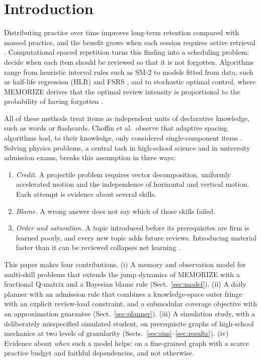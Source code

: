 \documentclass[runningheads]{llncs}
\begin{document}
\section{Introduction}

Distributing practice over time improves long-term retention compared with massed practice, and the benefit grows when each session requires active retrieval \cite{cepeda2006,kang2016}. Computational spaced repetition turns this finding into a scheduling problem: decide when each item should be reviewed so that it is not forgotten. Algorithms range from heuristic interval rules such as SM-2 \cite{wozniak1990} to models fitted from data, such as half-life regression (HLR) \cite{settles2016} and FSRS \cite{ye2022,su2023}, and to stochastic optimal control, where MEMORIZE derives that the optimal review intensity is proportional to the probability of having forgotten \cite{tabibian2019}.

All of these methods treat items as independent units of declarative knowledge, such as words or flashcards. Choffin et al.\ observe that adaptive spacing algorithms had, to their knowledge, only considered single-component items \cite{choffin2021}. Solving physics problems, a central task in high-school science and in university admission exams, breaks this assumption in three ways:

\begin{enumerate}
\item \emph{Credit.} A projectile problem requires vector decomposition, uniformly accelerated motion and the independence of horizontal and vertical motion. Each attempt is evidence about several skills.
\item \emph{Blame.} A wrong answer does not say which of those skills failed.
\item \emph{Order and saturation.} A topic introduced before its prerequisites are firm is learned poorly, and every new topic adds future reviews. Introducing material faster than it can be reviewed collapses net learning \cite{reddy2016}.
\end{enumerate}

This paper makes four contributions. (i) A memory and observation model for multi-skill problems that extends the jump dynamics of MEMORIZE with a fractional Q-matrix and a Bayesian blame rule (Sect.~\ref{sec:model}). (ii) A daily planner with an admission rule that combines a knowledge-space outer fringe with an explicit review-load constraint, and a submodular coverage objective with an approximation guarantee (Sect.~\ref{sec:planner}). (iii) A simulation study, with a deliberately misspecified simulated student, on prerequisite graphs of high-school mechanics at two levels of granularity (Sects.~\ref{sec:sim}--\ref{sec:results}). (iv) Evidence about \emph{when} such a model helps: on a fine-grained graph with a scarce practice budget and faithful dependencies, and not otherwise.
\end{document}
